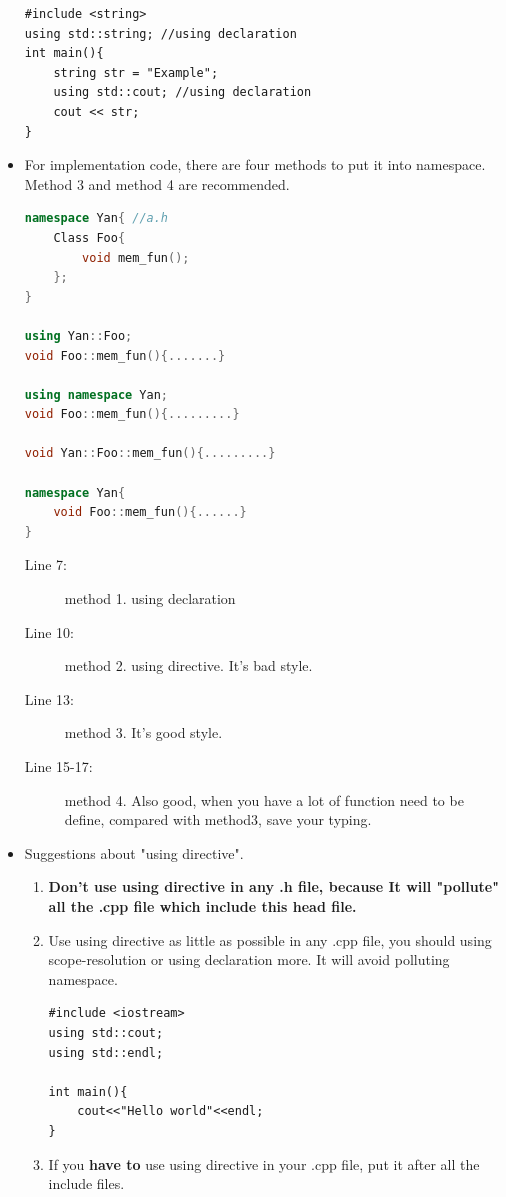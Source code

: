 \documentclass[a4paper,11pt,twoside]{book}
\begin{document}
\begin{itemize}
\begin{lstlisting}
#include <string>
using std::string; //using declaration
int main(){
	string str = "Example";
	using std::cout; //using declaration
	cout << str;
}
\end{lstlisting}
	
	\item For implementation code, there are four methods to put it into namespace. Method 3 and method 4 are recommended.
	
\begin{lstlisting}[frame=single, language=c++]
namespace Yan{ //a.h
	Class Foo{
		void mem_fun();
	};
}
	
using Yan::Foo;
void Foo::mem_fun(){.......}
	
using namespace Yan;
void Foo::mem_fun(){.........}
	
void Yan::Foo::mem_fun(){.........}

namespace Yan{ 
	void Foo::mem_fun(){......}
}
\end{lstlisting}
\begin{description}
	\item[Line 7:]method 1. using declaration
	\item[Line 10:]method 2. using directive. It's bad style.
	\item[Line 13:]method 3. It's good style.
	\item[Line 15-17:]method 4. Also good, when you have a lot of function need to be define, compared with method3, save your typing.
\end{description}
	
	\item Suggestions about "using directive".
	\begin{enumerate}

		\item  \textbf{Don't use using directive in any .h file,  because It will "pollute" all the .cpp file which include this head file.}
		
		\item Use using directive as little as possible in any .cpp file, you should using scope-resolution or using declaration more. It will avoid polluting namespace.
\begin{lstlisting}[numbers=none]
#include <iostream>
using std::cout;
using std::endl;

int main(){
	cout<<"Hello world"<<endl;
}
\end{lstlisting}
		
		\item If you \textbf{have to} use using directive in your .cpp file, put it after all the include files.
	\end{enumerate}
	

\end{itemize}
\end{document}
